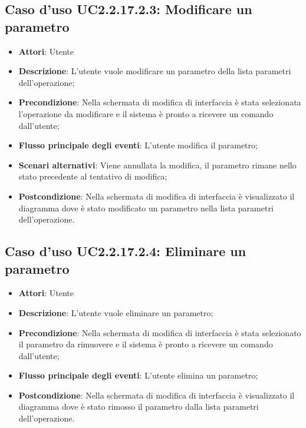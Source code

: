 \documentclass[../AnalisiDeiRequisiti.tex]{subfiles}
\begin{document}
				\subsection{Caso d'uso UC2.2.17.2.3: Modificare un parametro}
				\begin{itemize}
					\item \textbf{Attori}: Utente
					\item \textbf{Descrizione}: L'utente vuole modificare un parametro della lista parametri dell'operazione;
					\item \textbf{Precondizione}: Nella schermata di modifica di interfaccia è stata selezionata l'operazione da modificare e il sistema è pronto a ricevere un comando dall'utente;
					\item \textbf{Flusso principale degli eventi}: L'utente modifica il parametro;
					\item \textbf{Scenari alternativi}: Viene annullata la modifica, il parametro rimane nello stato precedente al tentativo di modifica;
					\item \textbf{Postcondizione}: Nella schermata di modifica di interfaccia è visualizzato il diagramma dove è stato modificato un parametro nella lista parametri dell'operazione.
				\end{itemize}
				\subsection{Caso d'uso UC2.2.17.2.4: Eliminare un parametro}
				\begin{itemize}
					\item \textbf{Attori}: Utente
					\item \textbf{Descrizione}: L'utente vuole eliminare un parametro;
					\item \textbf{Precondizione}: Nella schermata di modifica di interfaccia è stata selezionato il parametro da rimuovere e il sistema è pronto a ricevere un comando dall'utente;
					\item \textbf{Flusso principale degli eventi}: L'utente elimina un parametro;
					\item \textbf{Postcondizione}: Nella schermata di modifica di interfaccia è visualizzato il diagramma dove è stato rimosso il parametro dalla lista parametri dell'operazione.	
				\end{itemize}
\end{document}
